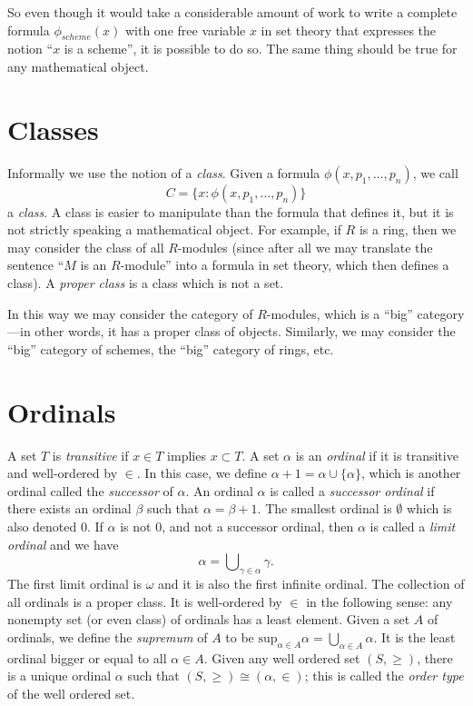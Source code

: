 \medskip\noindent
So even though it would take a considerable amount of work to write
a complete formula $\phi_{scheme}(x)$ with one free variable $x$ in set theory
that expresses the notion ``$x$ is a scheme'', it is possible to do so.
The same thing should be true for any mathematical object.

\section{Classes}
\label{section-classes}

\noindent
Informally we use the notion of a {\it class}. Given a formula
$\phi(x, p_1, \ldots, p_n)$, we call
$$
C = \{x : \phi(x, p_1, \ldots, p_n)\}
$$
a {\it class}. A class is easier to manipulate than the formula
that defines it, but it is not strictly speaking a mathematical
object. For example, if $R$ is a ring, then we may
consider the class of all $R$-modules (since after all we
may translate the sentence ``$M$ is an $R$-module''
into a formula in set theory, which then defines a class).
A {\it proper class} is a class which is not a set.

\medskip\noindent
In this way we may consider the category of $R$-modules,
which is a ``big'' category---in other words, it has a
proper class of objects. Similarly, we may consider
the ``big'' category of schemes, the ``big'' category
of rings, etc.



\section{Ordinals}
\label{section-ordinals}

\noindent
A set $T$ is {\it transitive} if $x\in T$ implies $x\subset T$.
A set $\alpha$ is an {\it ordinal} if it is transitive and well-ordered
by $\in$. In this case, we define $\alpha + 1 = \alpha \cup \{\alpha\}$,
which is another ordinal called the {\it successor} of $\alpha$.
An ordinal $\alpha$ is called a {\it successor ordinal} if
there exists an ordinal $\beta$ such that $\alpha = \beta + 1$.
The smallest ordinal is $\emptyset$ which is also denoted $0$.
If $\alpha$ is not $0$, and not a successor ordinal, then $\alpha$ is called
a {\it limit ordinal} and we have
$$
\alpha
=
\bigcup\nolimits_{\gamma \in \alpha} \gamma.
$$
The first limit ordinal is $\omega$ and it is also the first
infinite ordinal. The collection of all ordinals is a proper class.
It is well-ordered by $\in$ in the following sense: any nonempty set
(or even class) of ordinals has a least element.
Given a set $A$ of ordinals, we define the {\it supremum}
of $A$ to be $\text{sup}_{\alpha \in A} \alpha =
\bigcup_{\alpha \in A} \alpha$. It is the least ordinal bigger
or equal to all $\alpha \in A$.
Given any well ordered set $(S, \geq)$, there is a unique ordinal
$\alpha$ such that $(S, \geq) \cong (\alpha, \in)$; this is
called the {\it order type} of the well ordered set.

